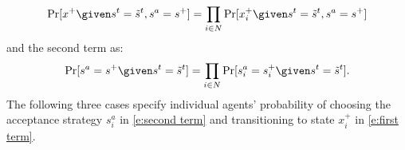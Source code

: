 \begin{align}\label{e:first term}
\Pr[x^+\given s^t = \tilde{s}^t, s^a = s^+]= \prod_{i\in N}\Pr[x_i^+\given s^t = \tilde{s}^t, s^a = s^+]
\end{align}
and the second term as:
\begin{align}\label{e:second term}
\Pr[ s^a = s^+\given s^t = \tilde{s}^t] = \prod_{i\in N}\Pr[ s_i^a = s_i^+\given s^t = \tilde{s}^t].
\end{align}
The following three cases specify individual agents' probability of choosing the acceptance strategy $s_i^a$ in \eqref{e:second term} and transitioning to state $x_i^+$ in \eqref{e:first term}. %
 

